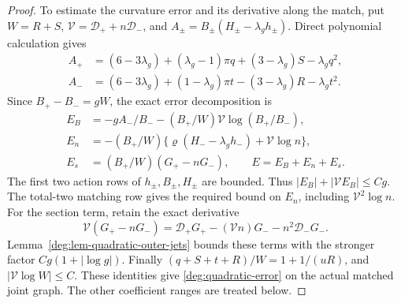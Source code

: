 \begin{proof}
To estimate the curvature error and its derivative along the match,
put \(W=R+S\), \(\mathcal V=\mathcal D_++n\mathcal D_-\), and
\(A_\pm=B_\pm(H_\pm-\lambda_gh_\pm)\). Direct polynomial calculation gives
\begin{align*}
 A_+&=(6-3\lambda_g)+(\lambda_g-1)\pi q
                 +(3-\lambda_g)S-\lambda_gq^2,\\
 A_-&=(6-3\lambda_g)+(1-\lambda_g)\pi t
                 -(3-\lambda_g)R-\lambda_gt^2.
\end{align*}
Since \(B_+-B_-=gW\), the exact error decomposition is
\begin{align*}
 E_B&=-gA_-/B_--(B_+/W)\mathcal V\log(B_+/B_-),\\
 E_n&=-(B_+/W)\{\varrho(H_--\lambda_gh_-)+\mathcal V\log n\},\\
 E_s&=(B_+/W)(G_+-nG_-),\qquad E=E_B+E_n+E_s.
\end{align*}
The first two action rows of \(h_\pm,B_\pm,H_\pm\) are bounded.
Thus \(|E_B|+|\mathcal VE_B|\le Cg\). The total-two matching row gives
the required bound on \(E_n\), including \(\mathcal V^2\log n\).
For the section term, retain the exact derivative
\[
 \mathcal V(G_+-nG_-)
 =\mathcal D_+G_+-(\mathcal Vn)G_--n^2\mathcal D_-G_-.
\]
Lemma~\ref{deg:lem-quadratic-outer-jets} bounds these terms with the
stronger factor \(Cg(1+|\log g|)\). Finally
\((q+S+t+R)/W=1+1/(uR)\), and \(|\mathcal V\log W|\le C\).
These identities give \eqref{deg:quadratic-error} on the actual
matched joint graph. The other coefficient ranges are treated below.


\end{proof}
